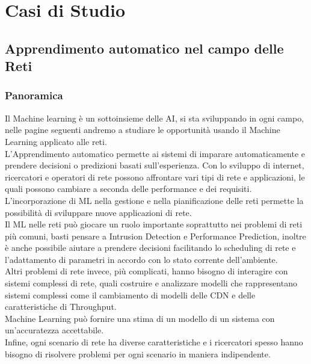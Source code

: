 \documentclass[../tesi.tex]{subfiles}
\begin{document}
\chapter{Casi di Studio}
\section{Apprendimento automatico nel campo delle Reti}



\subsection{Panoramica}


Il Machine learning è un sottoinsieme delle AI, si sta sviluppando in ogni campo, nelle pagine seguenti andremo a studiare le opportunità usando il Machine Learning applicato alle reti.\\
L'Apprendimento automatico permette ai sistemi di imparare automaticamente e prendere decisioni o predizioni basati sull’esperienza.
Con lo sviluppo di internet, ricercatori e operatori di rete possono affrontare vari tipi di rete e applicazioni, le quali possono cambiare a seconda delle performance e dei requisiti.\\
L’incorporazione di ML nella gestione e nella pianificazione delle reti permette la possibilità di sviluppare nuove applicazioni di rete.\\
Il ML nelle reti può giocare un ruolo importante soprattutto nei problemi di reti più comuni, basti pensare a Intrusion Detection e Performance Prediction, inoltre è anche possibile aiutare a prendere decisioni facilitando lo scheduling di rete e l’adattamento di parametri in accordo con lo stato corrente dell’ambiente.\\
Altri problemi di rete invece, più complicati, hanno bisogno di interagire con sistemi complessi di rete, quali costruire e analizzare modelli che rappresentano sistemi complessi come il cambiamento di modelli delle \Gls{CDN} e delle caratteristiche di \Gls{Throughput}.\\
Machine Learning può fornire una stima di un modello di un sistema con un’accuratezza accettabile.\\
Infine, ogni scenario di rete ha diverse caratteristiche e i ricercatori spesso hanno bisogno di risolvere problemi per ogni scenario in maniera indipendente.
\end{document}
